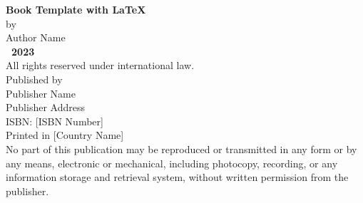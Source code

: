 
\fontsize{10pt}{10pt}\selectfont

\begin{center}
	{\Large \textbf{Book Template with \LaTeX}}\\
	\vspace{0.5cm}
	by\\
	\vspace{0.5cm}
	Author Name\\
	\vspace{1cm}
	\textbf{\textcopyright\ 2023}\\
	\vspace{0.5cm}
	All rights reserved under international law.\\
	\vspace{1cm}
	Published by\\
	Publisher Name\\
	Publisher Address\\
	\vspace{1cm}
	ISBN: [ISBN Number]\\
	\vspace{1cm}
	Printed in [Country Name]\\
	\vspace{0.5cm}
	No part of this publication may be reproduced or transmitted in any form or by any means, electronic or mechanical, including photocopy, recording, or any information storage and retrieval system, without written permission from the publisher.
\end{center}

\normalsize